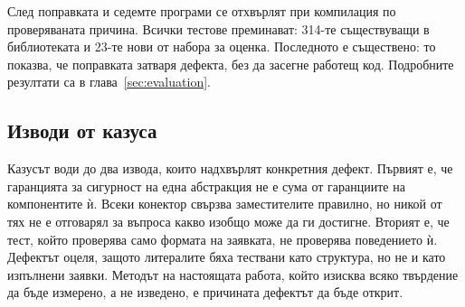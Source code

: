 След поправката и седемте програми се отхвърлят при компилация по проверяваната
причина. Всички тестове преминават: 314-те съществуващи в библиотеката и 23-те
нови от набора за оценка. Последното е съществено: то показва, че поправката
затваря дефекта, без да засегне работещ код. Подробните резултати са в
глава~\ref{sec:evaluation}.

\subsection{Изводи от казуса}
\label{sec:cs-lessons}

Казусът води до два извода, които надхвърлят конкретния дефект. Първият е, че
гаранцията за сигурност на една абстракция не е сума от гаранциите на
компонентите ѝ. Всеки конектор свързва заместителите правилно, но никой от тях не
е отговарял за въпроса какво изобщо може да ги достигне. Вторият е, че тест,
който проверява само формата на заявката, не проверява поведението ѝ. Дефектът
оцеля, защото литералите бяха тествани като структура, но не и като изпълнени
заявки. Методът на настоящата работа, който изисква всяко твърдение да бъде
измерено, а не изведено, е причината дефектът да бъде открит.
